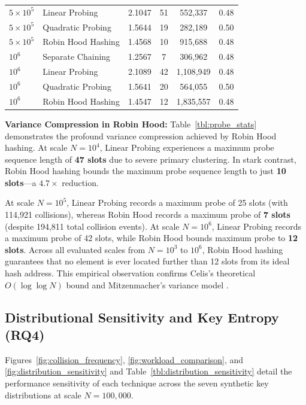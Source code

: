 \documentclass[conference]{IEEEtran}
\begin{document}
\begin{table}[t]
\begin{tabular}{llcccc}
$5 \times 10^5$ & Linear Probing & 2.1047 & 51 & 552,337 & 0.48 \\
$5 \times 10^5$ & Quadratic Probing & 1.5644 & 19 & 282,189 & 0.50 \\
$5 \times 10^5$ & Robin Hood Hashing & 1.4568 & 10 & 915,688 & 0.48 \\
\midrule
$10^6$ & Separate Chaining & 1.2567 & 7 & 306,962 & 0.48 \\
$10^6$ & Linear Probing & 2.1089 & 42 & 1,108,949 & 0.48 \\
$10^6$ & Quadratic Probing & 1.5641 & 20 & 564,055 & 0.50 \\
$10^6$ & Robin Hood Hashing & 1.4547 & 12 & 1,835,557 & 0.48 \\
\midrule
\bottomrule
\end{tabular}
\end{table}

\textbf{Variance Compression in Robin Hood:} Table~\ref{tbl:probe_stats} demonstrates the profound variance compression achieved by Robin Hood hashing. At scale $N = 10^4$, Linear Probing experiences a maximum probe sequence length of \textbf{47 slots} due to severe primary clustering. In stark contrast, Robin Hood hashing bounds the maximum probe sequence length to just \textbf{10 slots}---a $4.7\times$ reduction.

At scale $N = 10^5$, Linear Probing records a maximum probe of 25 slots (with 114,921 collisions), whereas Robin Hood records a maximum probe of \textbf{7 slots} (despite 194,811 total collision events). At scale $N = 10^6$, Linear Probing records a maximum probe of 42 slots, while Robin Hood bounds maximum probe to \textbf{12 slots}. Across all evaluated scales from $N = 10^3$ to $10^6$, Robin Hood hashing guarantees that no element is ever located further than 12 slots from its ideal hash address. This empirical observation confirms Celis's theoretical $O(\log \log N)$ bound \cite{celis1986} and Mitzenmacher's variance model \cite{mitzenmacher2017}.

\subsection{Distributional Sensitivity and Key Entropy (RQ4)}

Figures~\ref{fig:collision_frequency}, \ref{fig:workload_comparison}, and \ref{fig:distribution_sensitivity} and Table~\ref{tbl:distribution_sensitivity} detail the performance sensitivity of each technique across the seven synthetic key distributions at scale $N = 100,000$.
\end{document}
